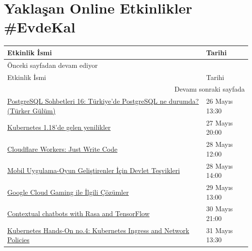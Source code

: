 \documentclass[11pt]{article}
\begin{document}
\section{Yaklaşan Online Etkinlikler \#EvdeKal}
\label{sec:orge5fe42d}
\begin{longtable}{|p{9.5cm}|l|}
\hline
Etkinlik İsmi & Tarihi\\
\hline
\endfirsthead
\multicolumn{2}{l}{Önceki sayfadan devam ediyor} \\
\hline

Etkinlik İsmi & Tarihi \\

\hline
\endhead
\hline\multicolumn{2}{r}{Devamı sonraki sayfada} \\
\endfoot
\endlastfoot
\hline
\href{https://kommunity.com/pgtr/events/postgresql-sohbetleri-16-turkiyede-postgresql-ne-durumda-turker-gulum-587e9d43}{PostgreSQL Sohbetleri 16: Türkiye'de PostgreSQL ne durumda? (Türker Gülüm)} & 26 Mayıs 13:30\\
\href{https://kommunity.com/devops-turkiye/events/kubernetes-118de-gelen-yenilikler-3defef02}{Kubernetes 1.18'de gelen yenilikler} & 27 Mayıs 20:00\\
\href{https://kommunity.com/cloud-and-serverless-turkey/events/cloudflare-workers-just-write-code-54aace34}{Cloudflare Workers: Just Write Code} & 28 Mayıs 12:00\\
\href{https://kommunity.com/teknoloji-gelistirenler-icin-devlet-tesvikleri/events/mobil-uygulama-oyun-gelistirenler-icin-devlet-tesvikleri-111055dc}{Mobil Uygulama-Oyun Geliştirenler İçin Devlet Teşvikleri} & 28 Mayıs 14:00\\
\href{https://kommunity.com/bilisim-vadisi/events/google-cloud-gaming-ile-ilgili-cozumler-75d9af64}{Google Cloud Gaming ile İlgili Çözümler} & 29 Mayıs 13:00\\
\href{https://kommunity.com/tensorflow-turkey/events/contextual-chatbots-with-rasa-and-tensorflow-36eee01c}{Contextual chatbots with Rasa and TensorFlow} & 30 Mayıs 21:00\\
\href{https://kommunity.com/cloud-and-serverless-turkey/events/kubernetes-hands-on-4-kubernetes-ingress-and-network-policies-4f1cd707}{Kubernetes Hands-On no.4: Kubernetes Ingress and Network Policies} & 31 Mayıs 13:30\\
\hline
\end{longtable}
\end{document}
